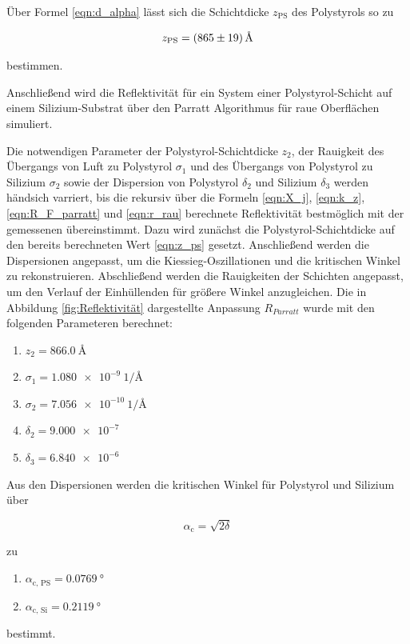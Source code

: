     Über Formel \ref{eqn:d_alpha} lässt sich die Schichtdicke $z_{\text{PS}}$ des Polystyrols so zu

    \begin{equation}
      z_{\text{PS}} = \SI{865+-19}{\angstrom}
      \label{eqn:z_ps}
    \end{equation}

    bestimmen.

    Anschließend wird die Reflektivität für ein System einer Polystyrol-Schicht auf einem Silizium-Substrat über den Parratt Algorithmus für raue Oberflächen simuliert.
    
    
    Die notwendigen Parameter der Polystyrol-Schichtdicke $z_2$, der Rauigkeit des Übergangs von Luft zu Polystyrol $\sigma_1$ und des Übergangs von Polystyrol zu Silizium $\sigma_2$ sowie der Dispersion von
    Polystyrol $\delta_2$ und Silizium $\delta_3$ werden händsich varriert, bis die rekursiv über die Formeln \ref{eqn:X_j}, \ref{eqn:k_z}, \ref{eqn:R_F_parratt} und \ref{eqn:r_rau} berechnete Reflektivität 
    bestmöglich mit der gemessenen übereinstimmt. Dazu wird 
    zunächst die Polystyrol-Schichtdicke auf den bereits berechneten Wert \ref{eqn:z_ps} gesetzt. Anschließend werden die Dispersionen angepasst, um die Kiessieg-Oszillationen und die kritischen Winkel
    zu rekonstruieren. Abschließend werden die Rauigkeiten der Schichten angepasst, um den Verlauf der Einhüllenden für größere Winkel anzugleichen. Die in Abbildung \ref{fig:Reflektivität} dargestellte 
    Anpassung $R_{Parratt}$ wurde mit den folgenden Parameteren berechnet:
    
    \begin{enumerate}
      \item $z_2=\SI{866.0}{\angstrom}$
      \item $\sigma_1=\SI{1.080e-9}{1\per\angstrom}$
      \item $\sigma_2=\SI{7.056e-10}{1\per\angstrom}$
      \item $\delta_2=\SI{9.000e-7}{}$
      \item $\delta_3=\SI{6.840e-6}{}$
    \end{enumerate}

    Aus den Dispersionen werden die kritischen Winkel für Polystyrol und Silizium über

    \begin{equation*}
      \alpha_{\text{c}} = \sqrt{2\delta}
    \end{equation*}

    zu

    \begin{enumerate}
      \item $\alpha_{\text{c, PS}} = \SI{0.0769}{\degree}$
      \item $\alpha_{\text{c, Si}} = \SI{0.2119}{\degree}$
    \end{enumerate}
    
    bestimmt.